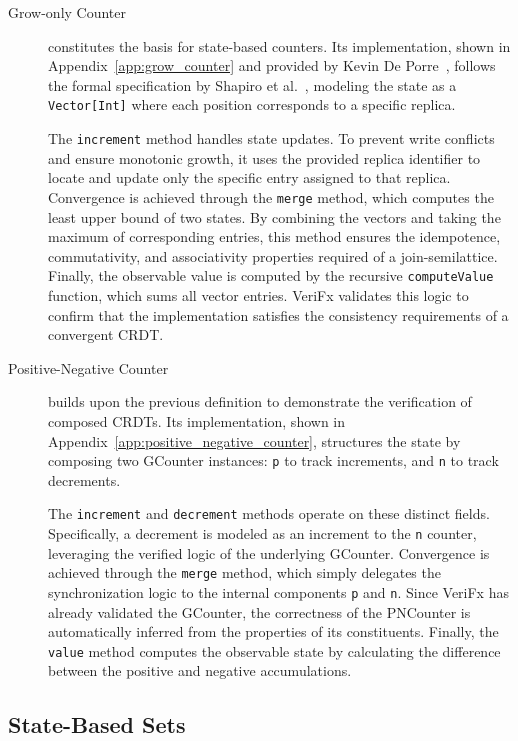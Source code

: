 \begin{description}
  \item[Grow-only Counter] constitutes the basis for state-based counters. Its implementation, shown in Appendix~\ref{app:grow_counter} and provided by Kevin De Porre~\cite{porre2023masses}, follows the formal specification by Shapiro et al.~\cite{shapiro2011comprehensive}, modeling the state as a \texttt{Vector[Int]} where each position corresponds to a specific replica.

        The \texttt{increment} method handles state updates. To prevent write conflicts and ensure monotonic growth, it uses the provided replica identifier to locate and update only the specific entry assigned to that replica. Convergence is achieved through the \texttt{merge} method, which computes the least upper bound of two states. By combining the vectors and taking the maximum of corresponding entries, this method ensures the idempotence, commutativity, and associativity properties required of a join-semilattice. Finally, the observable value is computed by the recursive \texttt{computeValue} function, which sums all vector entries. VeriFx validates this logic to confirm that the implementation satisfies the consistency requirements of a convergent CRDT.
  \item[Positive-Negative Counter] builds upon the previous definition to demonstrate the verification of composed CRDTs. Its implementation, shown in Appendix~\ref{app:positive_negative_counter}, structures the state by composing two GCounter instances: \texttt{p} to track increments, and \texttt{n} to track decrements.

        The \texttt{increment} and \texttt{decrement} methods operate on these distinct fields. Specifically, a decrement is modeled as an increment to the \texttt{n} counter, leveraging the verified logic of the underlying GCounter. Convergence is achieved through the \texttt{merge} method, which simply delegates the synchronization logic to the internal components \texttt{p} and \texttt{n}. Since VeriFx has already validated the GCounter, the correctness of the PNCounter is automatically inferred from the properties of its constituents. Finally, the \texttt{value} method computes the observable state by calculating the difference between the positive and negative accumulations.
\end{description}

\subsection{State-Based Sets}
\label{sub:state_sets}

